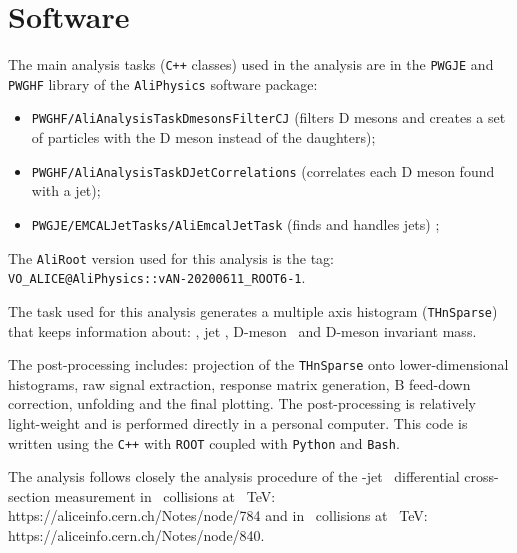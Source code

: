 \section{Software}

The main analysis tasks (\texttt{C++} classes) used in the analysis are in the \texttt{PWGJE} and \texttt{PWGHF} library of the \texttt{AliPhysics} software package:
\begin{itemize}
\item \texttt{PWGHF/AliAnalysisTaskDmesonsFilterCJ} (filters D mesons and creates a set of particles with the D meson instead of the daughters);
\item \texttt{PWGHF/AliAnalysisTaskDJetCorrelations} (correlates each D meson found with a jet);
\item \texttt{PWGJE/EMCALJetTasks/AliEmcalJetTask} (finds and handles jets) ;%
\end{itemize}
The \texttt{AliRoot} version used for this analysis is the tag: \texttt{VO\_ALICE@AliPhysics::vAN-20200611\_ROOT6-1}.

The task used for this analysis generates a multiple axis histogram (\texttt{THnSparse}) that keeps information about: \zpar, jet \pt, D-meson \pt\ and D-meson invariant mass.

The post-processing includes: projection of the \texttt{THnSparse} onto lower-dimensional histograms, raw signal extraction, response matrix generation, B feed-down correction, unfolding and the final plotting.
The post-processing is relatively light-weight and is performed directly in a personal computer. This code is written using the \texttt{C++} with \texttt{ROOT} coupled with \texttt{Python} and \texttt{Bash}.

The analysis follows closely the analysis procedure of the \Dzero-jet \pt\ differential cross-section measurement in \pPb\ collisions at ~TeV: https://aliceinfo.cern.ch/Notes/node/784 and in \pp\ collisions at ~TeV: https://aliceinfo.cern.ch/Notes/node/840.


